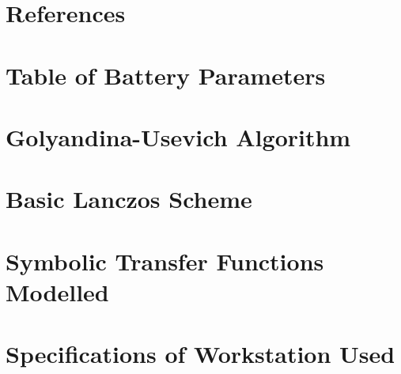 \section{References}

\appendix

\section{Table of Battery Parameters\label{sec:Table-of-Battery} }

\section{Golyandina-Usevich Algorithm}

\section{Basic Lanczos Scheme}

\section{Symbolic Transfer Functions Modelled}

\section{Specifications of Workstation Used\label{sec:Specifications-of-Workstation}}

